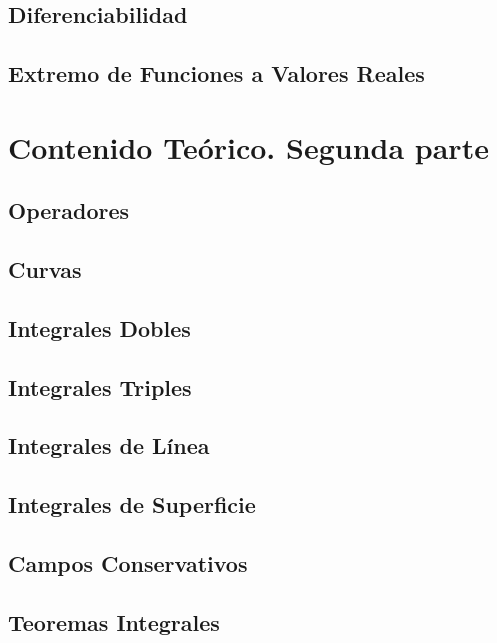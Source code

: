 \documentclass[10pt, a4paper]{report}
\begin{document}
        \section{Diferenciabilidad}
            
        \section{Extremo de Funciones a Valores Reales} 
            

    \chapter{Contenido Teórico. Segunda parte}
        \section{Operadores}
            
        \section{Curvas}
            
        \section{Integrales Dobles} 
            
        \section{Integrales Triples}
            
        \section{Integrales de L\'inea}
            
        \section{Integrales de Superficie}
        \section{Campos Conservativos}
            
        \section{Teoremas Integrales}
            
\end{document}
